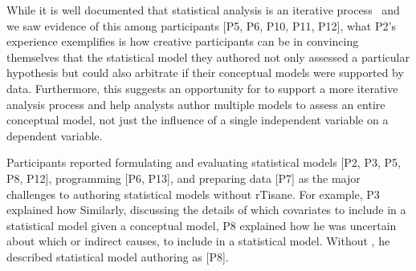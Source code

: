 While it is well documented that statistical analysis is an iterative
process~\cite{grolemund2014cognitive, jun2022hypoForm} and we saw evidence of
this among participants [P5, P6, P10, P11, P12], what P2's experience
exemplifies is how creative participants can be in convincing themselves that the
statistical model they authored not only assessed a particular hypothesis but
could also arbitrate if their conceptual models were supported by data.
Furthermore, this suggests an opportunity for \rTisane to support a more
iterative analysis process and help analysts author multiple models to assess an
entire conceptual model, not just the influence of a single independent variable
on a dependent variable. 




Participants reported formulating and evaluating statistical models [P2, P3, P5,
P8, P12], programming [P6, P13], and preparing data [P7] as the major challenges
to authoring statistical models without rTisane. For example, P3 explained how
 Similarly, discussing the details of
which covariates to include in a statistical model given a conceptual model, P8
explained how he was uncertain about which  or
indirect causes, to include in a statistical model. Without \rTisane, he
described statistical model authoring as  [P8].


